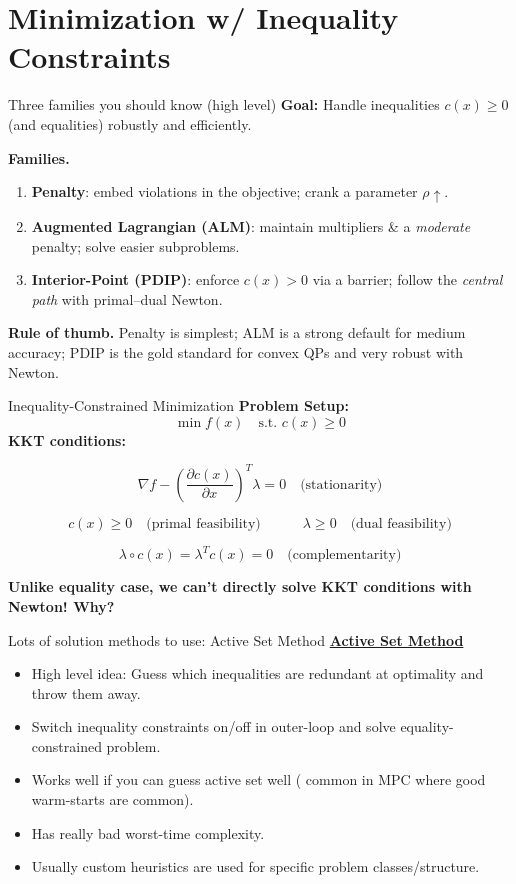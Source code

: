 \section{Minimization w/ Inequality Constraints}

\begin{frame}{Three families you should know (high level)}
\textbf{Goal:} Handle inequalities $c(x)\ge 0$ (and equalities) robustly and efficiently.

\medskip
\textbf{Families.}
\begin{enumerate}
\item \textbf{Penalty}: embed violations in the objective; crank a parameter $\rho\uparrow$.
\item \textbf{Augmented Lagrangian (ALM)}: maintain multipliers \& a \emph{moderate} penalty; solve easier subproblems.
\item \textbf{Interior-Point (PDIP)}: enforce $c(x)>0$ via a barrier; follow the \emph{central path} with primal--dual Newton.
\end{enumerate}

\textbf{Rule of thumb.} Penalty is simplest; ALM is a strong default for medium accuracy; PDIP is the gold standard for convex QPs and very robust with Newton. 
\end{frame}




\begin{frame}{Inequality-Constrained Minimization}
\textbf{Problem Setup:}
$$
\min f(x) \quad \text{s.t. } c(x) \geq 0
$$
\textbf{KKT conditions:} 

$$
\nabla f - \left(\frac{\partial c(x)}{\partial x}\right)^T \lambda = 0 \quad \text{(stationarity)}
$$

$$
c(x) \geq 0 \quad \text{(primal feasibility)} \quad \quad \quad  \lambda \geq 0 \quad \text{(dual feasibility)}
$$ 

$$
\lambda \circ c(x) = \lambda^T c(x) = 0 \quad \text{(complementarity)}
$$

\textbf{Unlike equality case, we can’t directly solve KKT conditions with Newton! Why?}

 
\end{frame}


\begin{frame}{Lots of solution methods to use: Active Set Method} 
\underline{\textbf{Active Set Method}}
\begin{itemize}
    \item High level idea: Guess which inequalities are redundant at optimality and throw them away.
    \item Switch inequality constraints on/off in outer-loop and solve equality-constrained problem.
    \item Works well if you can guess active set well ( common in MPC where good warm-starts are common).
    \item Has really bad worst-time complexity.
    \item Usually custom heuristics are used for specific problem classes/structure.

\end{itemize}
\end{frame}

